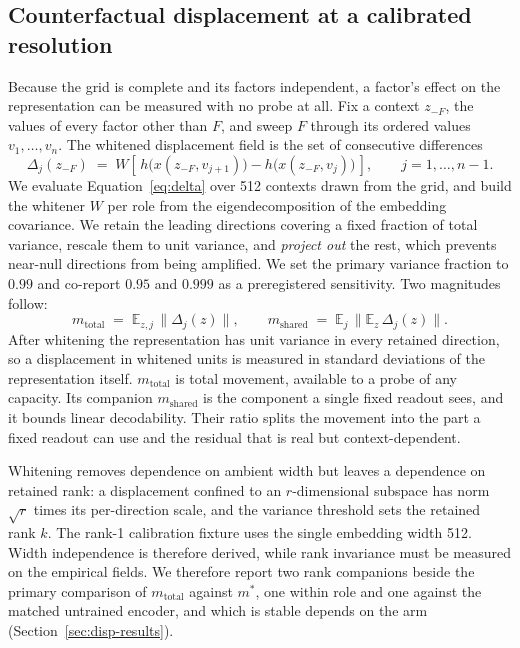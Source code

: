 \documentclass[10pt]{article}
\begin{document}
\subsection{Counterfactual displacement at a calibrated resolution}
\label{sec:certificate}
Because the grid is complete and its factors independent, a factor's effect on the representation
can be measured with no probe at all. Fix a context $z_{-F}$, the values of every factor other than
$F$, and sweep $F$ through its ordered values $v_1, \ldots, v_n$. The whitened displacement field is
the set of consecutive differences
\begin{equation}
\Delta_j(z_{-F}) \;=\; W\!\left[\, h\big(x(z_{-F}, v_{j+1})\big) - h\big(x(z_{-F}, v_j)\big)
\,\right],
\qquad j = 1, \ldots, n-1 .
\label{eq:delta}
\end{equation}
We evaluate Equation~\ref{eq:delta} over 512 contexts drawn from the grid, and build the whitener
$W$ per role from the
eigendecomposition of the embedding covariance. We retain the leading directions covering a fixed
fraction of total variance, rescale them to unit variance, and \emph{project out} the rest, which
prevents near-null directions from being amplified. We set the primary variance fraction to $0.99$ and co-report $0.95$ and $0.999$ as a preregistered
sensitivity. Two
magnitudes follow:
\begin{equation}
m_{\mathrm{total}} \;=\; \mathbb{E}_{z, j}\,\lVert \Delta_j(z) \rVert,
\qquad
m_{\mathrm{shared}} \;=\; \mathbb{E}_{j}\,\big\lVert \mathbb{E}_{z}\, \Delta_j(z) \big\rVert .
\label{eq:mtotal}
\end{equation}
After whitening the representation has unit variance in every retained direction, so a displacement
in whitened units is measured in standard deviations of the representation itself.
$m_{\mathrm{total}}$ is total movement, available to a probe of any capacity. Its companion
$m_{\mathrm{shared}}$ is the component a single fixed readout sees, and it bounds linear
decodability. Their ratio splits the movement into the part a fixed readout can use and the residual
that is real but context-dependent.

Whitening removes dependence on ambient width but leaves a dependence on retained rank: a
displacement confined to an $r$-dimensional subspace has norm $\sqrt{r}$ times its per-direction
scale, and the variance threshold sets the retained rank $k$. The rank-1 calibration fixture
uses the single embedding width 512. Width independence is therefore derived, while rank invariance
must be measured on the empirical fields. We therefore report two rank companions beside the primary
comparison of $m_{\mathrm{total}}$ against $m^{*}$, one within role and one against the matched
untrained encoder, and which is stable depends on the arm (Section~\ref{sec:disp-results}).
\end{document}
